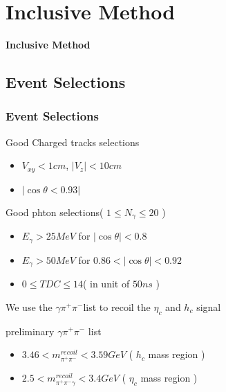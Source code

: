 \documentclass{beamer}
\begin{document}
\section{Inclusive Method}
\begin{frame}
    \begin{center}
        \Huge{\bf Inclusive Method}
    \end{center}
\end{frame}
\subsection{Event Selections}
\begin{frame}
    \frametitle{Event Selections}
    \begin{block}{Good Charged tracks selections}
        \begin{itemize}
            \item $V_{xy} < 1 cm$, $ | V_z | < 10 cm$
            \item $|\cos\theta < 0.93 |$
        \end{itemize}
    \end{block}
    \begin{block}{Good phton selections( $1\leq N_{\gamma}\leq 20$ )}
        \begin{itemize}
            \item $E_{\gamma} > 25 MeV$ for $|\cos\theta| < 0.8$
            \item $E_{\gamma} > 50 MeV$ for $0.86<|\cos\theta|<0.92$
            \item $0\leq TDC\leq 14 $( in unit of $50ns$ )
        \end{itemize}
    \end{block}
    We use the $\gamma\pi^+\pi^-$list to recoil the $\eta_c$ and $h_c$ signal
    \begin{block}{preliminary $\gamma\pi^+\pi^-$ list}
        \begin{itemize}
            \item $3.46<m_{\pi^+\pi^-}^{recoil}<3.59 GeV$ ( $h_c$ mass region )
            \item $2.5<m_{\pi^+\pi^-\gamma}^{recoil}<3.4 GeV$ ( $\eta_c$ mass region )
        \end{itemize}
    \end{block}
\end{frame}
\end{document}
